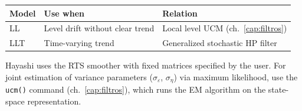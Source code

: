 \begin{center}
\begin{tabular}{lll}
\toprule
\textbf{Model} & \textbf{Use when} & \textbf{Relation} \\
\midrule
LL  & Level drift without clear trend    & Local level UCM (ch.~\ref{cap:filtros}) \\
LLT & Time-varying trend                 & Generalized stochastic HP filter \\
\bottomrule
\end{tabular}
\end{center}

\begin{nota}
  Hayashi uses the RTS smoother with fixed matrices specified by the
  user. For joint estimation of variance parameters
  ($\sigma_\varepsilon$, $\sigma_\eta$) via maximum likelihood,
  use the \texttt{ucm()} command (ch.~\ref{cap:filtros}), which runs
  the EM algorithm on the state-space representation.
\end{nota}
